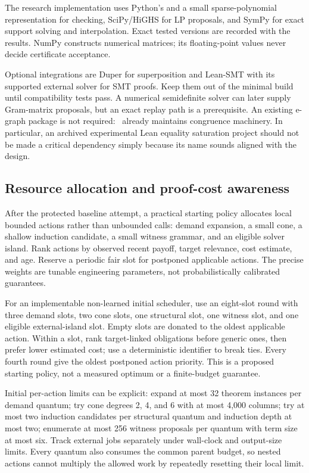 The research implementation uses Python's  and a
small sparse-polynomial representation for checking, SciPy/HiGHS for LP
proposals, and SymPy for exact support solving and interpolation. Exact tested
versions are recorded with the results. NumPy constructs numerical matrices;
its floating-point values never decide certificate acceptance.

Optional integrations are Duper for superposition and Lean-SMT with its
supported external solver for SMT proofs. Keep them out of the minimal build
until compatibility tests pass. A numerical semidefinite solver can later
supply Gram-matrix proposals, but an exact replay path is a prerequisite.
An existing e-graph package is not required: \grind\ already maintains
congruence machinery. In particular, an archived experimental Lean equality
saturation project should not be made a critical dependency simply because
its name sounds aligned with the design.

\subsection{Resource allocation and proof-cost awareness}

After the protected baseline attempt, a practical starting policy allocates
local bounded actions rather than unbounded calls: demand expansion, a small
cone, a shallow induction candidate, a small witness grammar, and an eligible
solver island. Rank actions by observed recent payoff, target relevance, cost
estimate, and age. Reserve a periodic fair slot for postponed applicable
actions. The precise weights are tunable engineering parameters, not
probabilistically calibrated guarantees.

For an implementable non-learned initial scheduler, use an eight-slot round
with three demand slots, two cone slots, one structural slot, one witness slot,
and one eligible external-island slot. Empty slots are donated to the oldest
applicable action. Within a slot, rank target-linked obligations before generic
ones, then prefer lower estimated cost; use a deterministic identifier to break
ties. Every fourth round give the oldest postponed action priority. This is a
proposed starting policy, not a measured optimum or a finite-budget guarantee.

Initial per-action limits can be explicit: expand at most 32 theorem instances
per demand quantum; try cone degrees 2, 4, and 6 with at most 4,000 columns;
try at most two induction candidates per structural quantum and induction depth
at most two; enumerate at most 256 witness proposals per quantum with term size
at most six. Track external jobs separately under wall-clock and output-size
limits. Every quantum also consumes the common parent budget, so nested actions
cannot multiply the allowed work by repeatedly resetting their local limit.

